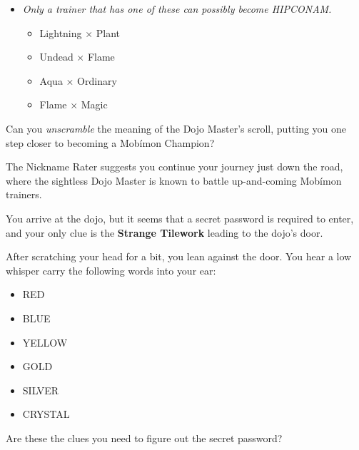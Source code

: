\documentclass{puzzlehunt}
\newcommand{\mappMobimon}{Mob\'imon}
\begin{document}
\begin{itemize}
\item \textit{Only a trainer that has one of these can possibly become HIPCONAM.}
\begin{itemize}
\item Lightning \(\times\) Plant
\item Undead \(\times\) Flame 
\item Aqua \(\times\) Ordinary
\item Flame \(\times\) Magic
\end{itemize}
\end{itemize}

Can you \textit{unscramble} the meaning of the Dojo Master's scroll, putting you one step closer to becoming a \mappMobimon{} Champion?

\vfill

\newpage


The Nickname Rater suggests you continue your journey just down the road, where the sightless Dojo Master is known to battle up-and-coming Mob\'imon trainers.

You arrive at the dojo, but it seems that a secret
password is required to enter, and your only clue is the \textbf{Strange Tilework} leading to the dojo's door.

After scratching your head for a bit, you lean against the door. You hear a low whisper carry the following words into your ear:

\begin{itemize}
\item RED
\item BLUE
\item YELLOW
\item GOLD
\item SILVER
\item CRYSTAL
\end{itemize}


Are these the clues you need to figure out the secret password?
\end{document}
